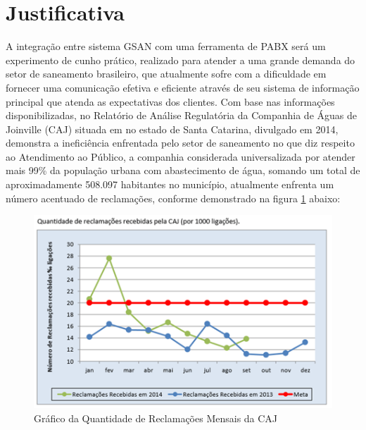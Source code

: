 \section*{Justificativa}
A integração entre sistema GSAN com uma ferramenta de PABX será um experimento de cunho prático, realizado para atender a uma grande demanda do setor de saneamento brasileiro, que atualmente sofre com a dificuldade em fornecer uma comunicação efetiva e eficiente através de seu sistema de informação principal que atenda as expectativas dos clientes.
Com base nas informações disponibilizadas, no Relatório de Análise Regulatória da Companhia de Águas de Joinville (CAJ) \cite{AMAE2014} 
situada em no estado de Santa Catarina, divulgado em 2014, demonstra a ineficiência enfrentada pelo setor de saneamento no que diz respeito ao Atendimento ao Público, a companhia considerada universalizada por atender mais 99\% da população urbana com abastecimento de água, somando um total de aproximadamente 508.097 habitantes no município, atualmente enfrenta um número acentuado de reclamações, conforme demonstrado na figura \ref{figura:ligacoesReclamacoes} abaixo:
 

\begin{figure}[!htb]
	\centering
	\caption{Gráfico da Quantidade de Reclamações Mensais da CAJ} 
	\label{figura:ligacoesReclamacoes}	
	\includegraphics{figuras/LigacoesReclamacoes.png}
\end{figure}


